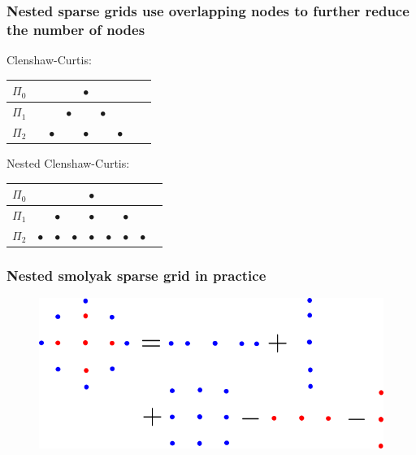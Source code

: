 \documentclass{beamer}
\begin{document}
 \begin{frame}
  \frametitle{Nested sparse grids use overlapping nodes to further reduce
  the number of nodes}

  \begin{alert}
      {Clenshaw-Curtis:}\\
      \scriptsize
    \normalsize
  \begin{table}
  \begin{tabular}{lcccccccc}
    $\Pi_0$& &&& $\bullet$& &&&  \\\hline
   $\Pi_1$ &&&$\bullet$& &$\bullet$&&& \\\hline
   $\Pi_2$ &&$\bullet$&&$\bullet$ &&$\bullet$&& \\
   \end{tabular}
  \end{table}
  \end{alert}
  \pause
  \begin{alert}
      {Nested Clenshaw-Curtis:}\\
      \scriptsize
    \normalsize
  \begin{table}
  \begin{tabular}{lcccccccc}
    $\Pi_0$& &&& $\bullet$& &&&  \\\hline
   $\Pi_1$ &&$\bullet$&& $\bullet$&&$\bullet$ && \\\hline
   $\Pi_2$ &$\bullet$&$\bullet$&$\bullet$& $\bullet$&$\bullet$&$\bullet$ &$\bullet$& \\
   \end{tabular}
  \end{table}
  \end{alert}

  \end{frame}

\begin{frame}
 \frametitle{Nested smolyak sparse grid in practice}


 \begin{figure}
  \includegraphics[width=\textwidth]{smolyak_nested.png}
 \end{figure}

\end{frame}
\end{document}
